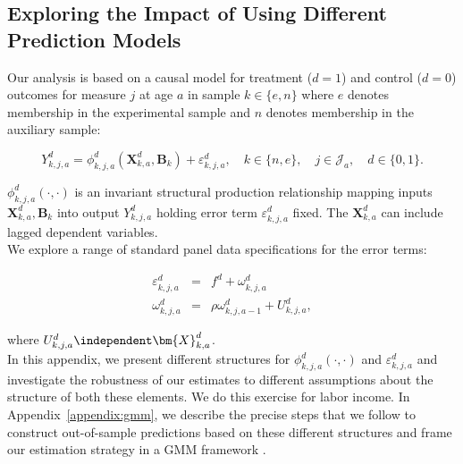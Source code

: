 \subsection{Exploring the Impact of Using Different Prediction Models} \label{appendix:predsensitivity}

\noindent Our analysis is based on a causal model for treatment ($d=1$) and control ($d=0$) outcomes for measure $j$ at age $a$ in sample $k \in \{e,n\}$ where $e$ denotes membership in the experimental sample and $n$ denotes membership in the auxiliary sample:

\begin{equation}\label{eq:outcome}
Y^d_{k,j,a} = \phi^d_{k,j,a} (\bm{X}^d_{k,a}, \bm{B}_k) + \varepsilon^d_{k,j,a}, \quad k \in \{n,e\}, \quad j \in \mathcal{J}_a, \quad d \in \{0, 1\}.
\end{equation}

\noindent $\phi^d_{k,j,a}\left( \cdot, \cdot \right)$ is an invariant structural production relationship mapping inputs $\bm{X}^d_{k,a}, \bm{B}_k$ into output $Y^d_{k,j,a}$ holding error term $\varepsilon^d_{k,j,a}$ fixed. The $\bm{X}^d_{k,a}$ can include lagged dependent variables.\\

\noindent We explore a range of standard panel data specifications for the error terms:

\begin{eqnarray}
\varepsilon^d_{k,j,a} &=& f^d + \omega^d_{k,j,a} \nonumber \\
\omega^d_{k,j,a}      &=& \rho \omega^d_{k,j,a-1} + U^d_{k,j,a},
\end{eqnarray}

\noindent where $U^d_{k,j,a} \independent \bm{X}^d_{k,a}$.\\

\noindent In this appendix, we present different structures for $\phi_{k,j,a}^d \left( \cdot, \cdot \right)$ and $\varepsilon_{k,j,a}^d$ and investigate the robustness of our estimates to different assumptions about the structure of both these elements. We do this exercise for labor income. In Appendix~\ref{appendix:gmm}, we describe the precise steps that we follow to construct out-of-sample predictions based on these different structures and frame our estimation strategy in a GMM framework \citep{Hansen_1982_Econometrica}.\\

